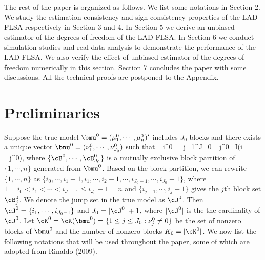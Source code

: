 \documentclass[12pt]{article}
\begin{document}
The rest of the paper is organized as follows.
We list some notations in Section 2.
We study the estimation consistency and sign consistency properties of
the LAD-FLSA  respectively in Section 3 and 4.
 In Section 5 we derive an unbiased estimator
 of the degrees of freedom  of the LAD-FLSA.
In Section 6 we conduct simulation studies and real data analysis
to demonstrate the
performance of the LAD-FLSA.
We also verify the effect of unbiased estimator of the degrees of freedom numerically in this section.
Section 7 concludes the paper with some
discussions.
All the technical proofs are postponed to the Appendix.


 \section{Preliminaries}
 Suppose the true model $\bmu^0=(\mu^0_1,\cdots,\mu^0_n)'$ includes $J_0$ blocks
 and there exists a unique vector $\bnu^0=(\nu^0_1, \cdots,\nu^0_{J_0})$ such that
\mu_i^0=\sum_{j=1}^{J_0} \nu_j^0~ I(i \in \cB_j^0),
\eel
where  $\{\cB_1^0, \cdots, \cB_{J_0}^0\}$ is a mutually exclusive  block partition of $\{1,\cdots, n\}$ generated from $\bmu^0$.
Based on the block partition, we can rewrite $\{1,\cdots,n\}$ as
$\{i_0,\cdots,i_1-1, i_1,\cdots, i_2-1, \cdots,i_{J_0-1},\cdots, i_{J_0}-1\}$, where
$1=i_0<i_1<\cdots<i_{J_0-1} \le i_{J_0}-1=n$ and $\{i_{j-1},\cdots,i_j-1\}$ gives
the $j$th block set $\cB_j^0$.
We denote the jump set in the true model as $\cJ^0$.
Then $\cJ^0=\{i_1,\cdots,i_{J_0-1}\}$ and
$J_0=|\cJ^0|+1$, where $|\cJ^0|$ is the
 the cardinality of $\cJ^0$.
Let $\cK^0=\cK(\bmu^0)=\{1\le j\le J_0: \nu_j^0\neq 0\}$
be the set of nonzero blocks of $\bmu^0$ and the number of nonzero blocks
$K_0=|\cK^0|$.
We now list the following notations that will be used throughout the
 paper, some of which are adopted from Rinaldo (2009).
\end{document}
